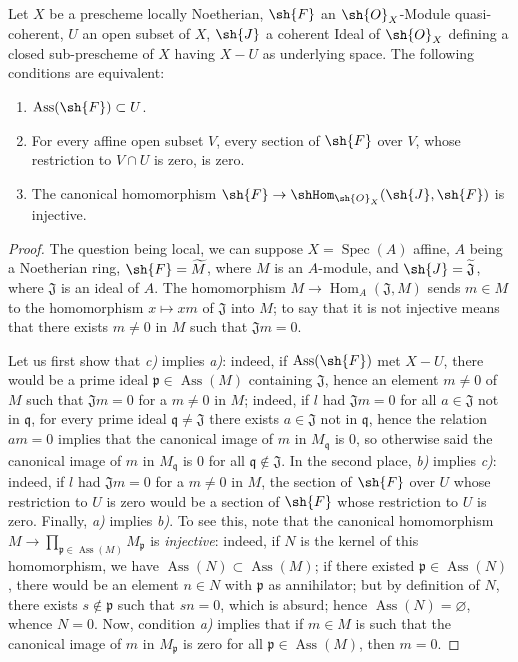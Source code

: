 
\begin{proposition}[3.1.8]
\label{IV.3.1.8}
Let $X$ be a prescheme locally Noetherian, $\sh{F}$ an $\sh{O}_X$-Module quasi-coherent, $U$ an open subset of $X$, $\sh{J}$ a coherent Ideal of $\sh{O}_X$ defining a closed sub-prescheme of $X$ having $X-U$ as underlying space.
The following conditions are equivalent:
\begin{enumerate}[label=\emph{\alph*)}]
  \item $\operatorname{Ass}(\sh{F})\subset U$.
  \item For every affine open subset $V$, every section of $\sh{F}$ over $V$, whose restriction to $V\cap U$ is zero, is zero.
  \item The canonical homomorphism $\sh{F}\to\shHom_{\sh{O}_X}(\sh{J},\sh{F})$ is injective.
\end{enumerate}
\end{proposition}

\begin{proof}
The question being local, we can suppose $X=\operatorname{Spec}(A)$ affine, $A$ being a Noetherian ring, $\sh{F}=\widetilde{M}$, where $M$ is an $A$-module, and $\sh{J}=\widetilde{\mathfrak{J}}$, where $\mathfrak{J}$ is an ideal of $A$.
The homomorphism $M\to\operatorname{Hom}_A(\mathfrak{J},M)$ sends $m\in M$ to the homomorphism $x\mapsto xm$ of $\mathfrak{J}$ into $M$; to say that it is not injective means that there exists $m\neq 0$ in $M$ such that $\mathfrak{J} m=0$.

Let us first show that \emph{c)} implies \emph{a)}: indeed, if $\operatorname{Ass}(\sh{F})$ met $X-U$, there would be a prime ideal $\mathfrak{p}\in\operatorname{Ass}(M)$ containing $\mathfrak{J}$, hence an element $m\neq 0$ of $M$ such that $\mathfrak{J} m=0$ for a $m\neq 0$ in $M$; indeed, if $l$ had $\mathfrak{J} m=0$ for all $a\in\mathfrak{J}$ not in $\mathfrak{q}$, for every prime ideal $\mathfrak{q}\neq\mathfrak{J}$ there exists $a\in\mathfrak{J}$ not in $\mathfrak{q}$, hence the relation $am=0$ implies that the canonical image of $m$ in $M_\mathfrak{q}$ is $0$, so otherwise said the canonical image of $m$ in $M_\mathfrak{q}$ is $0$ for all $\mathfrak{q}\notin\mathfrak{J}$.
In the second place, \emph{b)} implies \emph{c)}: indeed, if $l$ had $\mathfrak{J} m=0$ for a $m\neq 0$ in $M$, the section of $\sh{F}$ over $U$ whose restriction to $U$ is zero would be a section of $\sh{F}$ whose restriction to $U$ is zero.
Finally, \emph{a)} implies \emph{b)}.
To see this, note that the canonical homomorphism $M\to\prod_{\mathfrak{p}\in\operatorname{Ass}(M)}M_\mathfrak{p}$ is \emph{injective}: indeed, if $N$ is the kernel of this homomorphism, we have $\operatorname{Ass}(N)\subset\operatorname{Ass}(M)$; if there existed $\mathfrak{p}\in\operatorname{Ass}(N)$, there would be an element $n\in N$ with $\mathfrak{p}$ as annihilator; but by definition of $N$, there exists $s\notin\mathfrak{p}$ such that $sn=0$, which is absurd; hence $\operatorname{Ass}(N)=\varnothing$, whence $N=0$.
Now, condition \emph{a)} implies that if $m\in M$ is such that the canonical image of $m$ in $M_\mathfrak{p}$ is zero for all $\mathfrak{p}\in\operatorname{Ass}(M)$, then $m=0$.
\end{proof}

